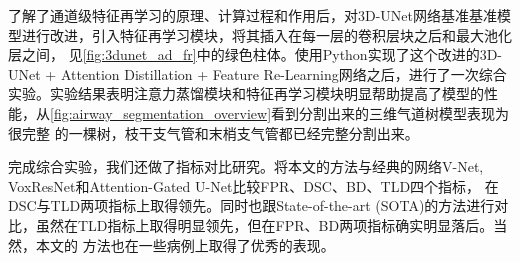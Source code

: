 了解了通道级特征再学习的原理、计算过程和作用后，对3D-UNet网络基准基准模型进行改进，引入特征再学习模块，将其插入在每一层的卷积层块之后和最大池化层之间，
见\autoref{fig:3dunet_ad_fr}中的绿色柱体。使用Python实现了这个改进的3D-UNet + Attention Distillation + Feature Re-Learning网络之后，进行了一次综合
实验。实验结果表明注意力蒸馏模块和特征再学习模块明显帮助提高了模型的性能，从\autoref{fig:airway_segmentation_overview}看到分割出来的三维气道树模型表现为很完整
的一棵树，枝干支气管和末梢支气管都已经完整分割出来。

完成综合实验，我们还做了指标对比研究。将本文的方法与经典的网络V-Net, VoxResNet和Attention-Gated U-Net比较FPR、DSC、BD、TLD四个指标，
在DSC与TLD两项指标上取得领先。同时也跟State-of-the-art (SOTA)的方法进行对比，虽然在TLD指标上取得明显领先，但在FPR、BD两项指标确实明显落后。当然，本文的
方法也在一些病例上取得了优秀的表现。